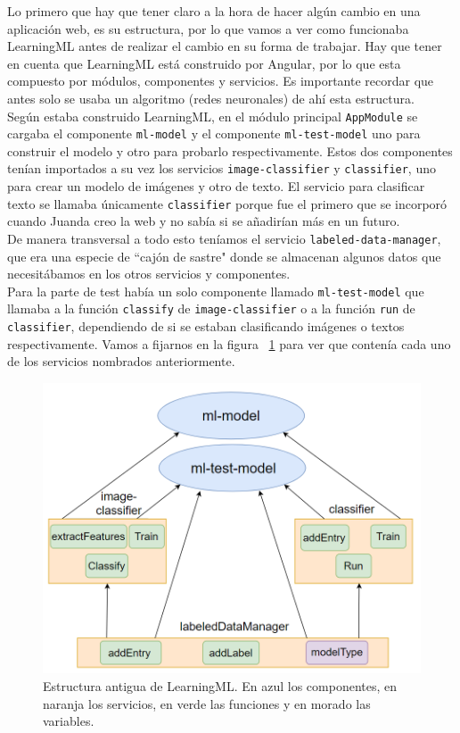 \documentclass[a4paper, 12pt]{book}
\begin{document}
Lo primero que hay que tener claro a la hora de hacer algún cambio en una aplicación web, es su estructura, por lo que vamos a ver como funcionaba LearningML antes de realizar el cambio en su forma de trabajar. Hay que tener en cuenta que LearningML está construido por Angular, por lo que esta compuesto por módulos, componentes y servicios. Es importante recordar que antes solo se usaba un algoritmo (redes neuronales) de ahí esta estructura. \\
Según estaba construido LearningML, en el módulo principal \texttt{AppModule} se cargaba el componente \texttt{ml-model} y el componente \texttt{ml-test-model} uno para construir el modelo y otro para probarlo respectivamente. Estos dos componentes tenían importados a su vez los servicios \texttt{image-classifier} y \texttt{classifier}, uno para crear un modelo de imágenes y otro de texto. El servicio para clasificar texto se llamaba únicamente \texttt{classifier} porque fue el primero que se incorporó cuando Juanda creo la web y no sabía si se añadirían más en un futuro. \\
De manera transversal a todo esto teníamos el servicio \texttt{labeled-data-manager}, que era una especie de ``cajón de sastre"  donde se almacenan algunos datos que necesitábamos en los otros servicios y componentes.\\
Para la parte de test había un solo componente llamado \texttt{ml-test-model} que llamaba a la función \texttt{classify} de \texttt{image-classifier} o a la función  \texttt{run} de \texttt{classifier}, dependiendo de si se estaban clasificando imágenes o textos respectivamente.
Vamos a fijarnos en la figura ~\ref{fig:modeloantiguo} para ver que contenía cada uno de los servicios nombrados anteriormente.

\begin{figure}
	\centering
	\includegraphics[width=12cm, keepaspectratio]{img/modeloantiguo}
	\caption{Estructura antigua de LearningML. En azul los componentes, en naranja los servicios, en verde las funciones y en morado las variables.}				\label{fig:modeloantiguo}
\end{figure}
\end{document}
